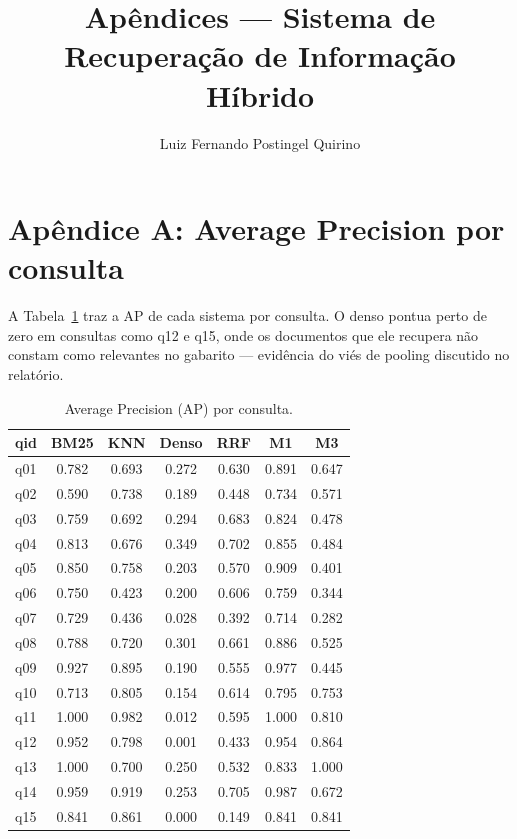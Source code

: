 \documentclass[12pt]{article}
\title{Apêndices — Sistema de Recuperação de Informação Híbrido}
\author{Luiz Fernando Postingel Quirino\inst{1}}
\begin{document}
\maketitle

\section*{Apêndice A: Average Precision por consulta}

A Tabela~\ref{tab:apx} traz a AP de cada sistema por consulta. O denso pontua perto de zero em consultas como q12 e q15, onde os documentos que ele recupera não constam como relevantes no gabarito — evidência do viés de pooling discutido no relatório.

\begin{table}[h]
\centering
\small
\caption{Average Precision (AP) por consulta.}
\label{tab:apx}
\begin{tabular}{lcccccc}
\toprule
\textbf{qid} & \textbf{BM25} & \textbf{KNN} & \textbf{Denso} & \textbf{RRF} & \textbf{M1} & \textbf{M3} \\
\midrule
q01 & 0.782 & 0.693 & 0.272 & 0.630 & 0.891 & 0.647 \\
q02 & 0.590 & 0.738 & 0.189 & 0.448 & 0.734 & 0.571 \\
q03 & 0.759 & 0.692 & 0.294 & 0.683 & 0.824 & 0.478 \\
q04 & 0.813 & 0.676 & 0.349 & 0.702 & 0.855 & 0.484 \\
q05 & 0.850 & 0.758 & 0.203 & 0.570 & 0.909 & 0.401 \\
q06 & 0.750 & 0.423 & 0.200 & 0.606 & 0.759 & 0.344 \\
q07 & 0.729 & 0.436 & 0.028 & 0.392 & 0.714 & 0.282 \\
q08 & 0.788 & 0.720 & 0.301 & 0.661 & 0.886 & 0.525 \\
q09 & 0.927 & 0.895 & 0.190 & 0.555 & 0.977 & 0.445 \\
q10 & 0.713 & 0.805 & 0.154 & 0.614 & 0.795 & 0.753 \\
q11 & 1.000 & 0.982 & 0.012 & 0.595 & 1.000 & 0.810 \\
q12 & 0.952 & 0.798 & 0.001 & 0.433 & 0.954 & 0.864 \\
q13 & 1.000 & 0.700 & 0.250 & 0.532 & 0.833 & 1.000 \\
q14 & 0.959 & 0.919 & 0.253 & 0.705 & 0.987 & 0.672 \\
q15 & 0.841 & 0.861 & 0.000 & 0.149 & 0.841 & 0.841 \\
\bottomrule
\end{tabular}
\end{table}
\end{document}
